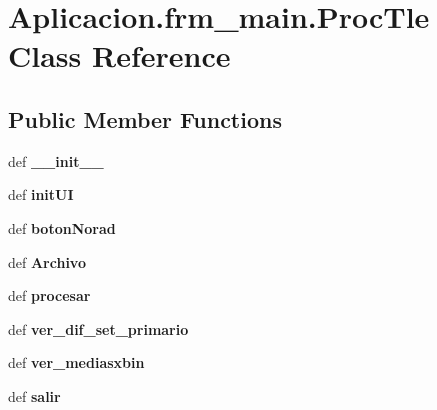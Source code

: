 \section{\-Aplicacion.\-frm\-\_\-main.\-Proc\-Tle \-Class \-Reference}
\label{class_aplicacion_1_1frm__main_1_1_proc_tle}
\subsection*{\-Public \-Member \-Functions}
\begin{DoxyCompactItemize}
\item 
def {\bf \-\_\-\-\_\-init\-\_\-\-\_\-}
\item 
def {\bf init\-U\-I}
\item 
def {\bf boton\-Norad}
\item 
def {\bf \-Archivo}
\item 
def {\bf procesar}
\item 
def {\bf ver\-\_\-dif\-\_\-set\-\_\-primario}
\item 
def {\bf ver\-\_\-mediasxbin}
\item 
def {\bf salir}
\end{DoxyCompactItemize}
